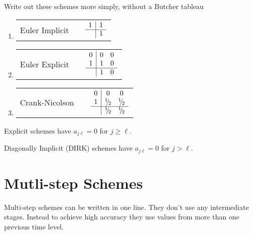 Write out these schemes more simply, without a Butcher tableau
\begin{enumerate}
\item %
\begin{tabular}{>{\raggedright}p{}>{\centering}p{}>{\raggedleft}p{}}
Euler Implicit &  & $\begin{array}{c|c}
1 & 1\\
\hline  & 1
\end{array}$\tabularnewline
\end{tabular}
\item %
\begin{tabular}{>{\raggedright}p{}>{\centering}p{}>{\raggedleft}p{}}
Euler Explicit &  & $\begin{array}{c|cc}
0 & 0 & 0\\
1 & 1 & 0\\
\hline  & 1 & 0
\end{array}$\tabularnewline
\end{tabular}
\item %
\begin{tabular}{>{\raggedright}p{}>{\centering}p{}>{\raggedleft}p{}}
Crank-Nicolson & \optBlock{$\begin{array}{c}
\mathbf{y}^{n+1}=\mathbf{y}^{n}+\frac{1}{2}\Delta t\left(\mathbf{f}(\mathbf{y}^{n})+\mathbf{f}(\mathbf{y}^{n+1})\right)\end{array}$} & $\begin{array}{c|cc}
0 & 0 & 0\\
1 & \half & \half\\
\hline  & \half & \half
\end{array}$\tabularnewline
\end{tabular}
\end{enumerate}
\vfill{}
Explicit schemes have $a_{j\ell}=0$ for $j\ge\ell$.

Diagonally Implicit (DIRK) schemes have $a_{j\ell}=0$ for $j>\ell$.

\clearpage{}

\section{Mutli-step Schemes}

Multi-step schemes can be written in one line. They don't use any
intermediate stages. Instead to achieve high accuracy they use values
from more than one previous time level. 

